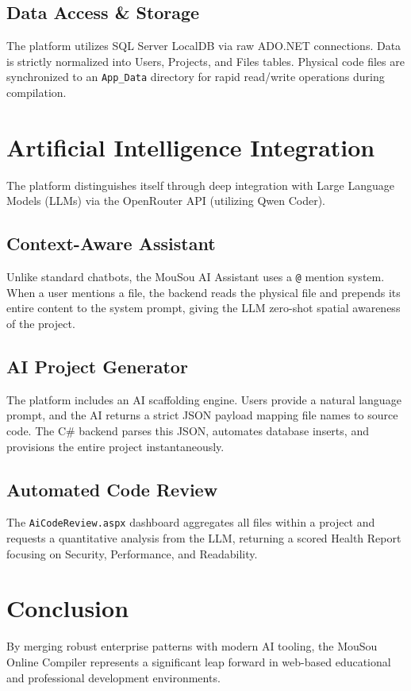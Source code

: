 \documentclass[12pt, a4paper]{article}
\begin{document}
\subsection{Data Access \& Storage}
The platform utilizes SQL Server LocalDB via raw ADO.NET connections. Data is strictly normalized into Users, Projects, and Files tables. Physical code files are synchronized to an \texttt{App\_Data} directory for rapid read/write operations during compilation.

\section{Artificial Intelligence Integration}
The platform distinguishes itself through deep integration with Large Language Models (LLMs) via the OpenRouter API (utilizing Qwen Coder).

\subsection{Context-Aware Assistant}
Unlike standard chatbots, the MouSou AI Assistant uses a \texttt{@} mention system. When a user mentions a file, the backend reads the physical file and prepends its entire content to the system prompt, giving the LLM zero-shot spatial awareness of the project.

\subsection{AI Project Generator}
The platform includes an AI scaffolding engine. Users provide a natural language prompt, and the AI returns a strict JSON payload mapping file names to source code. The C\# backend parses this JSON, automates database inserts, and provisions the entire project instantaneously.

\subsection{Automated Code Review}
The \texttt{AiCodeReview.aspx} dashboard aggregates all files within a project and requests a quantitative analysis from the LLM, returning a scored Health Report focusing on Security, Performance, and Readability.

\section{Conclusion}
By merging robust enterprise patterns with modern AI tooling, the MouSou Online Compiler represents a significant leap forward in web-based educational and professional development environments.
\end{document}
